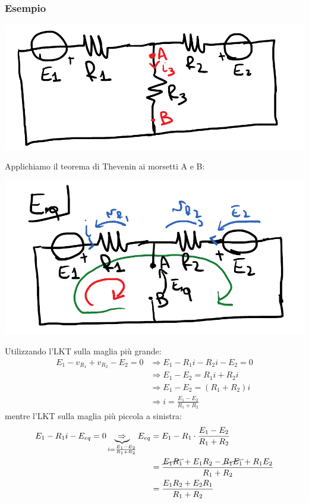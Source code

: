 \documentclass{article}
\begin{document}
\subsubsection{Esempio}
\begin{center}
    \includegraphics[scale=0.27]{Image/Esempio_Thevenin_1.png}
\end{center}
Applichiamo il teorema di Thevenin ai morsetti A e B:
\begin{center}
    \includegraphics[scale=0.3]{Image/Esempio_Thevenin_2.png}
\end{center}
Utilizzando l'LKT sulla maglia più grande:
\begin{align*}
    E_1 - v_{R_1} + v_{R_2} - E_2=0 &\Rightarrow E_1 - R_1i - R_2i - E_2=0\\
    &\Rightarrow E_1 - E_2 = R_1i + R_2 i \\
    & \Rightarrow E_1 - E_2 = (R_1 + R_2)i\\ 
    & \Rightarrow i = \frac{E_1-E_2}{R_1+R_2}
\end{align*}
mentre l'LKT sulla maglia più piccola a sinistra:
\begin{align*}
    E_1 - R_1i -E_{eq}=0 \underbrace{\Rightarrow}_{i=\frac{E_1-E_2}{R_1+R_2}} E_{eq} &= E_1-R_1 \cdot \frac{E_1-E_2}{R_1+R_2} \\
    &= \frac{\cancel{E_1R_1}+E_1R_2-\cancel{R_1E_1}+R_1E_2}{R_1+R_2}\\
    & = \frac{E_1R_2+E_2R_1}{R_1+R_2}
\end{align*}
\end{document}
